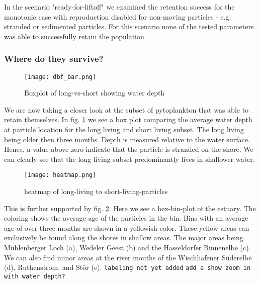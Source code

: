 \medskip

In the scenario "ready-for-liftoff" we examined the retention success for the monotonic case with reproduction disabled for non-moving particles - e.g. stranded or sedimented particles.
For this scenario none of the tested parameters was able to successfully retain the population.





\subsubsection*{Where do they survive?}

\begin{figure}
    \texttt{[image: dbf\_bar.png]}
    \caption[]{Boxplot of long-vs-short showing water depth}
    \label{fig:migration-long-vs-short}
\end{figure}

We are now taking a closer look at the subset of pytoplankton that was able to retain themselves.
In fig. \ref{fig:migration-long-vs-short} we see a box plot comparing the average water depth at particle location for the long living and short living subset. The long living being older then three months.
Depth is measured relative to the water surface. Hence, a value above zero indicate that the particle is stranded on the shore.
We can clearly see that the long living subset predominantly lives in shallower water.

\begin{figure}
    \texttt{[image: heatmap.png]}
    \caption[]{heatmap of long-living to short-living-particles}
    \label{fig:migration-long-vs-short-heatmap}
\end{figure}

This is further supported by fig. \ref{fig:migration-long-vs-short-heatmap}.
Here we see a hex-bin-plot of the estuary. The coloring shows the average age of the particles in the bin.
Bins with an average age of over three months are shown in a yellowish color.
These yellow areas can exclusively be found along the shores in shallow areas.
The major areas being Mühlenberger Loch (a), Wedeler Geest (b) and the Hasseldorfer Binnenelbe (c). We can also find minor areas at the river mouths of the Wischhafener Süderelbe (d), Ruthenstrom, and Stör (e). \texttt{labeling not yet added}
\texttt{add a show zoom in with water depth?}





